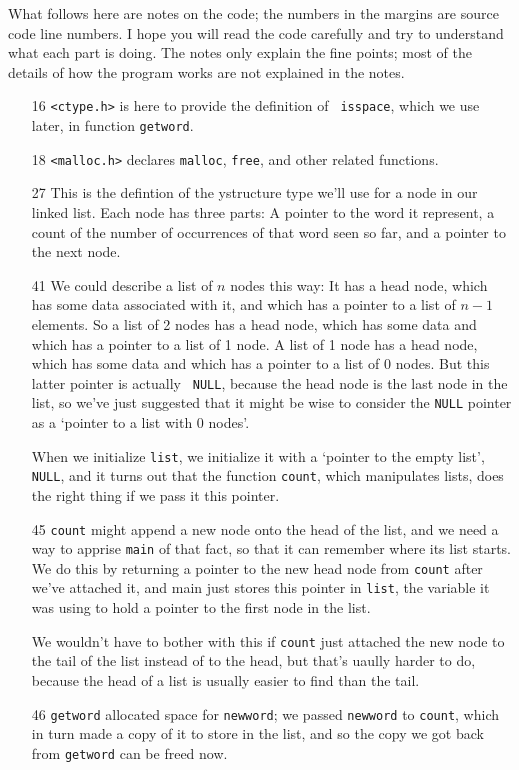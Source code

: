 What follows here are notes on the code; the numbers in the margins are
source code line numbers.  I hope you will read the code carefully and
try to understand what each part is doing.  The notes only explain the
fine points; most of the details of how the program works are not
explained in the notes.  

\begin{itemize}
\item[16] {\tt <ctype.h>} is here to provide the definition of {\tt
isspace}, which we use later, in function  {\tt getword}.  
\item[18] {\tt <malloc.h>} declares {\tt malloc}, {\tt free}, and other
related functions. 
\item[27] This is the defintion of the ystructure type we'll use for a
node in our linked list.  Each node has three parts:  A pointer to the
word it represent, a count of the number of occurrences of that word
seen so far, and a pointer to the next node.   
\item[41]  We could describe a list of $n$ nodes this way:  It has a
head node, which has some data associated with it, and which has a
pointer to a list of $n-1$ elements.  So a list of 2 nodes has a head
node, which has some data and which has a pointer to a list of 1 node.
A list of 1 node has a head node, which has some data and which has a
pointer to a list of 0 nodes.  But this latter pointer is actually {\tt
NULL}, because the head node is the last node in the list, so we've just
suggested that it might be wise to consider the {\tt NULL} pointer as a
`pointer to a list with 0 nodes'.

When we initialize {\tt list}, we initialize it with a `pointer to the
empty list', {\tt NULL}, and it turns out that the function {\tt count},
which manipulates lists, does the right thing if we pass it this
pointer.  

\item[45] {\tt count} might append a new node onto the head of the list,
and we need a way to apprise {\tt main} of that fact, so that it can
remember where its list starts.  We do this by returning a pointer to
the new head node from {\tt count} after we've attached it, and main
just stores this pointer in {\tt list}, the variable it was using to
hold a pointer to the first node in the list.

We wouldn't have to bother with this if {\tt count} just attached the
new node to the tail of the list instead of to the head, but that's
uaully harder to do, because the head of a list is usually easier to
find than the tail.  
\item[46] {\tt getword} allocated space for {\tt newword}; we passed
{\tt newword} to {\tt count}, which in turn made a copy of it to store
in the list, and so the copy we got back from {\tt getword} can be freed
now.  


\end{itemize}

